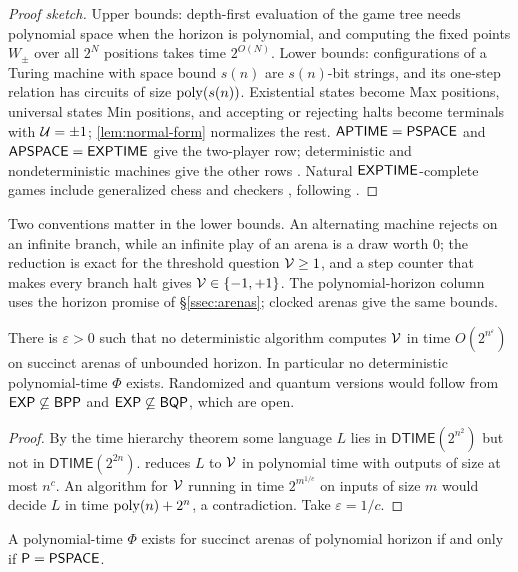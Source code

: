 \begin{proof}[Proof sketch]
Upper bounds: depth-first evaluation of the game tree needs polynomial space when the horizon is polynomial, and computing the fixed points $W_{\pm}$ over all $2^N$ positions takes time $2^{O(N)}$. Lower bounds: configurations of a Turing machine with space bound $s(n)$ are $s(n)$-bit strings, and its one-step relation has circuits of size $\operatorname{poly}(s(n))$. Existential states become Max positions, universal states Min positions, and accepting or rejecting halts become terminals with $\mathcal{U}=\pm1$; \cref{lem:normal-form} normalizes the rest. $\mathsf{APTIME}=\mathsf{PSPACE}$ and $\mathsf{APSPACE}=\mathsf{EXPTIME}$ \cite{CKS} give the two-player row; deterministic and nondeterministic machines give the other rows \cite{HearnDemaine}. Natural $\mathsf{EXPTIME}$-complete games include generalized chess \cite{FraenkelLichtenstein} and checkers \cite{Robson}, following \cite{StockmeyerChandra}.
\end{proof}

Two conventions matter in the lower bounds. An alternating machine rejects on an infinite branch, while an infinite play of an arena is a draw worth $0$; the reduction is exact for the threshold question $\mathcal{V}\ge1$, and a step counter that makes every branch halt gives $\mathcal{V}\in\{-1,+1\}$. The polynomial-horizon column uses the horizon promise of \S\ref{ssec:arenas}; clocked arenas give the same bounds.

\begin{corollary}\label{cor:exp}
There is $\varepsilon>0$ such that no deterministic algorithm computes $\mathcal{V}$ in time $O(2^{n^{\varepsilon}})$ on succinct arenas of unbounded horizon. In particular no deterministic polynomial-time $\Phi$ exists. Randomized and quantum versions would follow from $\mathsf{EXP}\not\subseteq\mathsf{BPP}$ and $\mathsf{EXP}\not\subseteq\mathsf{BQP}$, which are open.
\end{corollary}

\begin{proof}
By the time hierarchy theorem \cite{HartmanisStearns} some language $L$ lies in $\mathsf{DTIME}(2^{n^2})$ but not in $\mathsf{DTIME}(2^{2n})$.  reduces $L$ to $\mathcal{V}$ in polynomial time with outputs of size at most $n^c$. An algorithm for $\mathcal{V}$ running in time $2^{m^{1/c}}$ on inputs of size $m$ would decide $L$ in time $\operatorname{poly}(n)+2^{n}$, a contradiction. Take $\varepsilon=1/c$.
\end{proof}

\begin{corollary}\label{cor:polyhorizon}
A polynomial-time $\Phi$ exists for succinct arenas of polynomial horizon if and only if $\mathsf{P}=\mathsf{PSPACE}$.
\end{corollary}

